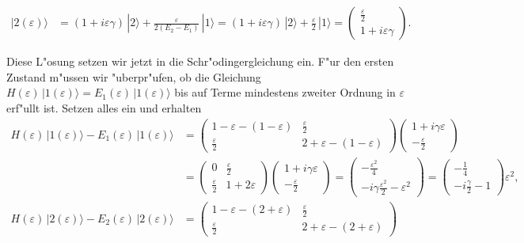 \begin{loesung}
\begin{teilaufgaben}
\begin{align*}
\\
|2(\varepsilon)\rangle
&=
(1+i\varepsilon\gamma)\,|2\rangle
	+ \frac{\varepsilon}{2(E_2-E_1)}\,|1\rangle
=
(1+i\varepsilon\gamma)\,|2\rangle
	+ \frac{\varepsilon}{2}\,|1\rangle
=
\begin{pmatrix}
\displaystyle\frac{\varepsilon}2
\\
1+i\varepsilon\gamma
\end{pmatrix}.
\end{align*}
\item
Diese L"osung setzen wir jetzt in die Schr"odingergleichung ein.
F"ur den ersten Zustand m"ussen wir "uberpr"ufen, ob die Gleichung
$H(\varepsilon)\, |1(\varepsilon)\rangle
=E_1(\varepsilon)\,|1(\varepsilon)\rangle$
bis auf Terme mindestens zweiter Ordnung in $\varepsilon$ erf"ullt ist.
Setzen alles ein und erhalten
\begin{align*}
H(\varepsilon)\, |1(\varepsilon)\rangle -E_1(\varepsilon)\,|1(\varepsilon)\rangle
&=
\begin{pmatrix}
1-\varepsilon-(1-\varepsilon)&\frac{\varepsilon}2\\
\frac{\varepsilon}2&2+\varepsilon-(1-\varepsilon)
\end{pmatrix}
\begin{pmatrix}
1+i\gamma\varepsilon\\-\frac{\varepsilon}2
\end{pmatrix}
\\
&=
\begin{pmatrix}
0&\frac{\varepsilon}2\\
\frac{\varepsilon}2&1+2\varepsilon
\end{pmatrix}
\begin{pmatrix}
1+i\gamma\varepsilon\\-\frac{\varepsilon}2
\end{pmatrix}
=
\begin{pmatrix}
-\frac{\varepsilon^2}{4}
\\
-i\gamma\frac{\varepsilon^2}2-\varepsilon^2
\end{pmatrix}
=
\begin{pmatrix}
-\frac14
\\
-i\frac{\gamma}2-1
\end{pmatrix}
\varepsilon^2,
\\
H(\varepsilon)\, |2(\varepsilon)\rangle -E_2(\varepsilon)\,|2(\varepsilon)\rangle
&=
\begin{pmatrix}
1-\varepsilon - (2+\varepsilon) & \frac{\varepsilon}2\\
\frac{\varepsilon}2&2+\varepsilon -(2+\varepsilon)

\end{pmatrix}
\end{align*}
\end{teilaufgaben}
\end{loesung}
